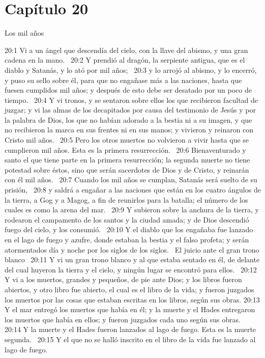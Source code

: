 \section*{Capítulo 20}
Los mil años  

20:1 Vi a un ángel que descendía del cielo, con la llave del abismo, y una gran cadena en la mano.  
20:2 Y prendió al dragón, la serpiente antigua, que es el diablo y Satanás, y lo ató por mil años;  
20:3 y lo arrojó al abismo, y lo encerró, y puso su sello sobre él, para que no engañase más a las naciones, hasta que fuesen cumplidos mil años; y después de esto debe ser desatado por un poco de tiempo.  
20:4 Y vi tronos, y se sentaron sobre ellos los que recibieron facultad de juzgar; y vi las almas de los decapitados por causa del testimonio de Jesús y por la palabra de Dios, los que no habían adorado a la bestia ni a su imagen, y que no recibieron la marca en sus frentes ni en sus manos; y vivieron y reinaron con Cristo mil años.  
20:5 Pero los otros muertos no volvieron a vivir hasta que se cumplieron mil años. Esta es la primera resurrección.  
20:6 Bienaventurado y santo el que tiene parte en la primera resurrección; la segunda muerte no tiene potestad sobre éstos, sino que serán sacerdotes de Dios y de Cristo, y reinarán con él mil años.  
20:7 Cuando los mil años se cumplan, Satanás será suelto de su prisión,  
20:8 y saldrá a engañar a las naciones que están en los cuatro ángulos de la tierra, a Gog y a Magog, a fin de reunirlos para la batalla; el número de los cuales es como la arena del mar.  
20:9 Y subieron sobre la anchura de la tierra, y rodearon el campamento de los santos y la ciudad amada; y de Dios descendió fuego del cielo, y los consumió.  
20:10 Y el diablo que los engañaba fue lanzado en el lago de fuego y azufre, donde estaban la bestia y el falso profeta; y serán atormentados día y noche por los siglos de los siglos.  
El juicio ante el gran trono blanco  
20:11 Y vi un gran trono blanco y al que estaba sentado en él, de delante del cual huyeron la tierra y el cielo, y ningún lugar se encontró para ellos.  
20:12 Y vi a los muertos, grandes y pequeños, de pie ante Dios; y los libros fueron abiertos, y otro libro fue abierto, el cual es el libro de la vida; y fueron juzgados los muertos por las cosas que estaban escritas en los libros, según sus obras. 
20:13 Y el mar entregó los muertos que había en él; y la muerte y el Hades entregaron los muertos que había en ellos; y fueron juzgados cada uno según sus obras.  
20:14 Y la muerte y el Hades fueron lanzados al lago de fuego. Esta es la muerte segunda.  
20:15 Y el que no se halló inscrito en el libro de la vida fue lanzado al lago de fuego.  
